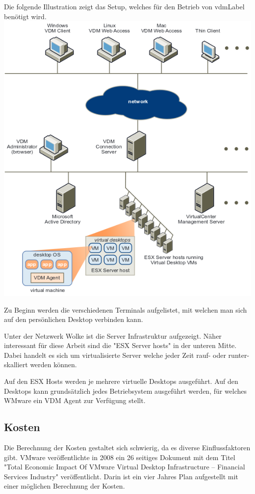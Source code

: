 Die folgende Illustration zeigt das Setup, welches für den Betrieb von \Gls{vdmLabel} benötigt wird.
\includegraphics[width=\textwidth]{images/vmware-vdm-setup}

Zu Beginn werden die verschiedenen Terminals aufgelistet, mit welchen man sich auf den persönlichen Desktop verbinden kann. 

Unter der Netzwerk Wolke ist die Server Infrastruktur aufgezeigt.
Näher interessant für diese Arbeit sind die "ESX Server hosts" in der unteren Mitte. Dabei handelt es sich um virtualisierte Server welche jeder Zeit rauf- oder runter-skalliert werden können. 

Auf den ESX Hosts werden je mehrere virtuelle Desktops ausgeführt. 
Auf den Desktops kann grundsätzlich jedes Betriebsystem ausgeführt werden, für welches WMware ein VDM Agent zur Verfügung stellt.



\subsection{Kosten}
Die Berechnung der Kosten gestaltet sich schwierig, da es diverse Einflussfaktoren gibt.
VMware veröffentlichte in 2008 ein 26 seitiges Dokument mit dem Titel "Total Economic Impact Of VMware Virtual Desktop Infrastructure – Financial Services Industry" %
veröffentlicht. Darin ist ein vier Jahres Plan aufgestellt mit einer möglichen Berechnung der Kosten.

